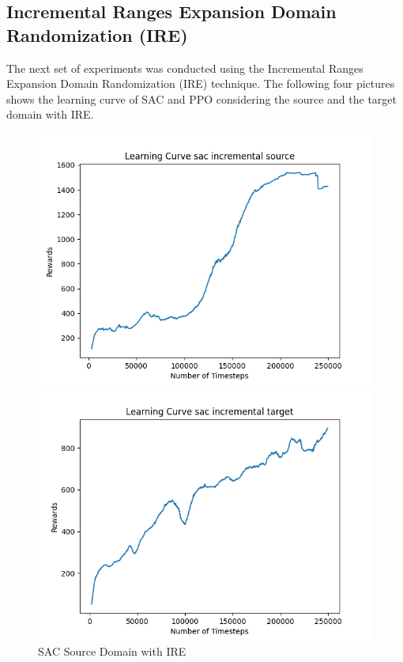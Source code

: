 \documentclass[11pt]{article}
\begin{document}
\subsection{Incremental Ranges Expansion Domain Randomization (IRE)}

The next set of experiments was conducted using the Incremental Ranges Expansion Domain Randomization (IRE) technique. The following four pictures shows the learning curve of SAC and PPO considering the source and the target domain with IRE.

\begin{figure}[H]
    \centering
    \begin{minipage}{0.45\textwidth}
        \centering
        \includegraphics[width=\textwidth]{../images/Learning_Curve_SAC_Incremental_Source.png}
        \caption{SAC Source Domain with IRE}
        \label{fig:sac_source_ire}
    \end{minipage}
    \hfill
    \begin{minipage}{0.45\textwidth}
        \centering
        \includegraphics[width=\textwidth]{../images/Learning_Curve_SAC_Incremental_Target.png}

\end{minipage}
\end{figure}
\end{document}
